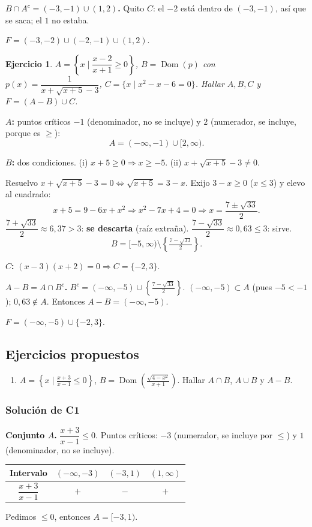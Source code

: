 \documentclass[11pt,a4paper]{article}
\theoremstyle{ej}
\newtheorem{ejercicio}{Ejercicio}[section]
\newcommand{\dom}{\operatorname{Dom}}
\begin{document}
\textbf{$B\cap A^c=(-3,-1)\cup(1,2)$.} Quito $C$: el $-2$ está dentro de $(-3,-1)$, así que se saca; el $1$ no estaba.
\begin{respuesta}
$F=(-3,-2)\cup(-2,-1)\cup(1,2).$
\end{respuesta}

\begin{ejercicio}
$A=\left\{x\;\Big|\;\dfrac{x-2}{x+1}\ge0\right\}$, \; $B=\dom(p)$ con $p(x)=\dfrac1{x+\sqrt{x+5}-3}$,
\; $C=\{x\mid x^2-x-6=0\}$. Hallar $A,B,C$ y $F=(A-B)\cup C$.
\end{ejercicio}

\textbf{$A$:} puntos críticos $-1$ (denominador, no se incluye) y $2$ (numerador, se incluye, porque es $\ge$):
\[ A=(-\infty,-1)\cup[2,\infty). \]

\textbf{$B$:} dos condiciones. (i) $x+5\ge0\Rightarrow x\ge-5$. (ii) $x+\sqrt{x+5}-3\ne0$.

Resuelvo $x+\sqrt{x+5}-3=0\iff\sqrt{x+5}=3-x$. Exijo $3-x\ge0$ ($x\le3$) y elevo al cuadrado:
\[ x+5=9-6x+x^2\Rightarrow x^2-7x+4=0\Rightarrow x=\frac{7\pm\sqrt{33}}2. \]
$\dfrac{7+\sqrt{33}}2\approx6{,}37>3$: \textbf{se descarta} (raíz extraña). $\dfrac{7-\sqrt{33}}2\approx0{,}63\le3$: sirve.
\[ B=[-5,\infty)\setminus\left\{\tfrac{7-\sqrt{33}}2\right\}. \]

\textbf{$C$:} $(x-3)(x+2)=0\Rightarrow C=\{-2,3\}$.

\textbf{$A-B=A\cap B^c$.} $B^c=(-\infty,-5)\cup\left\{\tfrac{7-\sqrt{33}}2\right\}$.
$(-\infty,-5)\subset A$ (pues $-5<-1$); $0{,}63\notin A$. Entonces $A-B=(-\infty,-5)$.
\begin{respuesta}
$F=(-\infty,-5)\cup\{-2,3\}.$
\end{respuesta}

\subsection{Ejercicios propuestos}
\begin{enumerate}[label=\textbf{C\arabic*.}]
  \item $A=\left\{x\mid\frac{x+3}{x-1}\le0\right\}$, $B=\dom\!\left(\frac{\sqrt{4-x^2}}{x+1}\right)$.
        Hallar $A\cap B$, $A\cup B$ y $A-B$.
\end{enumerate}
\subsubsection*{Solución de C1}
\textbf{Conjunto $A$.} $\dfrac{x+3}{x-1}\le0$. Puntos críticos: $-3$ (numerador, se incluye por $\le$) y $1$ (denominador, no se incluye).
\begin{center}
\begin{tabular}{c|ccc}
Intervalo & $(-\infty,-3)$ & $(-3,1)$ & $(1,\infty)$\\ \hline
$\dfrac{x+3}{x-1}$ & $+$ & $-$ & $+$
\end{tabular}
\end{center}
Pedimos $\le0$, entonces $A=[-3,1)$.
\end{document}
